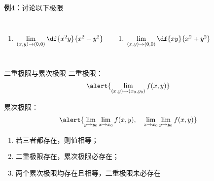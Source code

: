 \begin{frame}
	\linespread{1.2}
	\begin{exampleblock}{{\bf 例4：}讨论以下极限\hfill}
		\begin{columns}
				\begin{enumerate}
				  \item $\lim\limits_{(x,y)\to(0,0)}\df{x^2y}{x^2+y^2}$
				\end{enumerate}
				\begin{enumerate}
				  \addtocounter{enumi}{1}
				  \item $\lim\limits_{(x,y)\to(0,0)}\df{xy}{x^2+y^2}$
				\end{enumerate}
		\end{columns}
	\end{exampleblock}\pause 
	\begin{center}
	\end{center}
\end{frame}

\begin{frame}{二重极限与累次极限}
	\linespread{1.2}\pause 
	{\bb 二重极限：}\quad $$\alert{\lim\limits_{(x,y)\to(x_0,y_0)}f(x,y)}$$
	
	\pause 
	{\bb 累次极限：}\quad $$\alert{\lim\limits_{y\to y_0}\lim\limits_{x\to
	x_0}f(x,y),\quad \lim\limits_{x\to x_0}\lim\limits_{y\to y_0}f(x,y)}$$
	\vspace{-1em}\pause 
	\begin{enumerate}
	  \item 若三者都存在，则值相等；\pause 
	  \item 二重极限存在，累次极限必存在；\pause 
	  \item 两个累次极限均存在且相等，二重极限未必存在
	\end{enumerate}
\end{frame}


